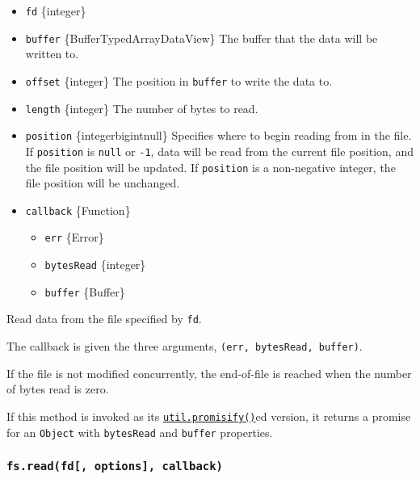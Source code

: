 \begin{itemize}
\tightlist
\item
  \texttt{fd} \{integer\}
\item
  \texttt{buffer} \{Buffer\textbar TypedArray\textbar DataView\} The
  buffer that the data will be written to.
\item
  \texttt{offset} \{integer\} The position in \texttt{buffer} to write
  the data to.
\item
  \texttt{length} \{integer\} The number of bytes to read.
\item
  \texttt{position} \{integer\textbar bigint\textbar null\} Specifies
  where to begin reading from in the file. If \texttt{position} is
  \texttt{null} or \texttt{-1}, data will be read from the current file
  position, and the file position will be updated. If \texttt{position}
  is a non-negative integer, the file position will be unchanged.
\item
  \texttt{callback} \{Function\}

  \begin{itemize}
  \tightlist
  \item
    \texttt{err} \{Error\}
  \item
    \texttt{bytesRead} \{integer\}
  \item
    \texttt{buffer} \{Buffer\}
  \end{itemize}
\end{itemize}

Read data from the file specified by \texttt{fd}.

The callback is given the three arguments,
\texttt{(err,\ bytesRead,\ buffer)}.

If the file is not modified concurrently, the end-of-file is reached
when the number of bytes read is zero.

If this method is invoked as its
\href{util.md\#utilpromisifyoriginal}{\texttt{util.promisify()}}ed
version, it returns a promise for an \texttt{Object} with
\texttt{bytesRead} and \texttt{buffer} properties.

\subsubsection{\texorpdfstring{\texttt{fs.read(fd{[},\ options{]},\ callback)}}{fs.read(fd{[}, options{]}, callback)}}\label{fs.readfd-options-callback}

